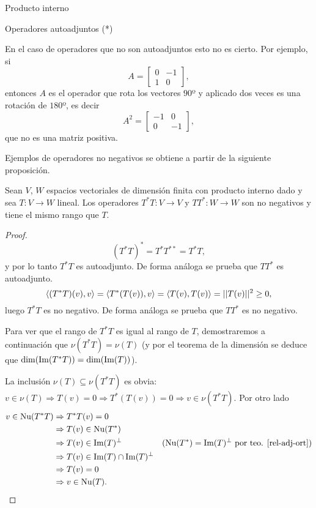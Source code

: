 \begin{chapter}{Producto interno}
\begin{section}{Operadores autoadjuntos (*)}
\begin{observacion*}
        En el caso de operadores que no son autoadjuntos esto no es cierto. Por  ejemplo, si 
        $$
        A = \begin{bmatrix}
        0&-1 \\ 1&0 
        \end{bmatrix},
        $$
        entonces $A$ es el operador que rota los vectores $90$º y aplicado dos veces es una rotación de $180$º,  es decir  
        $$
        A^2 = \begin{bmatrix}
        -1&0 \\ 0&-1 
        \end{bmatrix},
        $$
        que no es una matriz positiva.
        \end{observacion*}
        
        Ejemplos de operadores no negativos se obtiene a partir de la siguiente proposición.
        
        \begin{proposicion}\label{prop5.26}
            Sean $V$, $W$ espacios vectoriales de dimensión finita con producto interno dado y sea $T: V \to W$ lineal. Los operadores $T^*T: V \to V$ y $TT^*: W \to W$ son  no negativos y tiene el mismo rango que $T$.
        \end{proposicion}
        \begin{proof}
            $$
            (T^*T)^* = T^* T^{**} = T^*T,
            $$
            y por lo tanto $T^*T$ es autoadjunto. De forma análoga se prueba que $TT^*$ es autoadjunto.
            $$
            \langle (T^*T)(v), v \rangle = \langle T^*(T(v)), v \rangle = \langle T(v), T(v) \rangle = ||T(v)||^2 \ge 0,  
            $$
            luego $T^*T$  es no negativo.  De forma análoga se prueba que $TT^*$ es no negativo.
            
            Para ver que el rango de $T^*T$ es igual al rango  de $T$, demostraremos a continuación que  $\nu(T^*T) = \nu(T)$ (y por el teorema de la dimensión se deduce que $\dim(\operatorname{Im}(T^*T)) = \dim(\operatorname{Im}(T))$).
            
            La inclusión $\nu(T) \subseteq \nu(T^*T)$ es obvia:  $v \in \nu(T) \Rightarrow T(v) = 0 \Rightarrow T^*(T(v)) =0 \Rightarrow v \in \nu(T^*T)$. Por otro lado
            \begin{align*}
                v \in \operatorname{Nu}(T^*T) &\Rightarrow T^*T(v) = 0& & \\
                &\Rightarrow T(v) \in \operatorname{Nu}(T^*) && \\
                &\Rightarrow T(v) \in \operatorname{Im}(T)^\perp &&\text{($\operatorname{Nu}(T^*) = \operatorname{Im}(T)^\perp$  por teo. \ref{rel-adj-ort})} \\
                &\Rightarrow T(v) \in \operatorname{Im}(T) \cap \operatorname{Im}(T)^\perp&&\\
                &\Rightarrow T(v) = 0 &&\\
                &\Rightarrow v \in \operatorname{Nu}(T). &&
            \end{align*}
        \end{proof}
        

\end{section}
\end{chapter}
